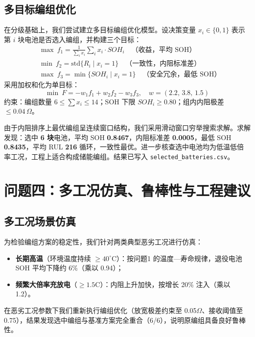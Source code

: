 \documentclass[withoutpreface]{cumcmthesis}
\begin{document}
\subsection{多目标编组优化}
在分级基础上，我们尝试建立多目标编组优化模型。设决策变量 $x_i\in\{0,1\}$ 表示第 $i$ 块电池是否选入编组，并构建三个目标：
\begin{align}
& \max\ f_1=\frac{1}{\sum_i x_i}\sum_i x_i\cdot SOH_i \quad \text{（收益，平均 SOH）}\\
& \min\ f_2=\mathrm{std}\{R_i\mid x_i=1\} \quad \text{（一致性，内阻标准差）}\\
& \max\ f_3=\min\{SOH_i\mid x_i=1\} \quad \text{（安全冗余，最低 SOH）}
\end{align}
采用加权和化为单目标：
\begin{equation}
\min\ F=-w_1 f_1+w_2 f_2-w_3 f_3,\quad w=(2.2,\,3.8,\,1.5)
\label{eq:weighted}
\end{equation}
约束：编组数量 $6\le\sum x_i\le14$；SOH 下限 $SOH_i\ge0.80$；组内内阻极差 $\le0.04\,\Omega$。

由于内阻排序上最优编组呈连续窗口结构，我们采用滑动窗口穷举搜索求解。求解发现：选中 \textbf{6 块}电池，平均 SOH \textbf{0.8467}，内阻标准差 \textbf{0.0005}，最低 SOH \textbf{0.8435}，平均 RUL \textbf{216} 循环，一致性最优。进一步核查选中电池均为低温低倍率工况，工程上适合构成储能编组。结果已写入 \texttt{selected\_batteries.csv}。

\newpage
\section{问题四：多工况仿真、鲁棒性与工程建议}

\subsection{多工况场景仿真}
为检验编组方案的稳定性，我们针对两类典型恶劣工况进行仿真：
\begin{itemize}[itemindent=2em]
\item \textbf{长期高温}（环境温度持续 $\ge40^\circ$C）：按问题1 的温度—寿命规律，退役电池 SOH 平均下降约 6\%（乘以 0.94）；
\item \textbf{频繁大倍率充放电}（$\ge1.5$C）：内阻上升加快，按增长 20\% 注入（乘以 1.2）。
\end{itemize}
在恶劣工况参数下我们重新执行编组优化（放宽极差约束至 0.05$\Omega$、接收阈值至 0.75），结果发现选中编组与基准方案完全重合（6/6），说明原编组具备良好鲁棒性。
\end{document}

